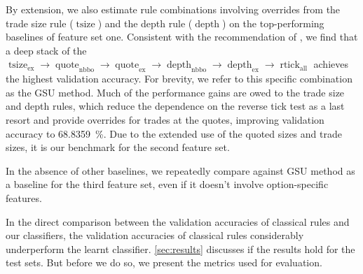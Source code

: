 By extension, we also estimate rule combinations involving overrides from the trade size rule ($\operatorname{tsize}$) and the depth rule ($\operatorname{depth}$) on the top-performing baselines of feature set one. Consistent with the recommendation of \textcite[][14]{grauerOptionTradeClassification2022}, we find that a deep stack of the $\operatorname{tsize}_{\mathrm{ex}} \to \operatorname{quote}_{\mathrm{nbbo}} \to \operatorname{quote}_{\mathrm{ex}} \to \operatorname{depth}_{\mathrm{nbbo}} \to \operatorname{depth}_{\mathrm{ex}} \to \operatorname{rtick}_{\mathrm{all}}$ achieves the highest validation accuracy. For brevity, we refer to this specific combination as the \gls{GSU} method. Much of the performance gains are owed to the trade size and depth rules, which reduce the dependence on the reverse tick test as a last resort and provide overrides for trades at the quotes, improving validation accuracy to \SI{68.8359}{\percent}. Due to the extended use of the quoted sizes and trade sizes, it is our benchmark for the second feature set.

In the absence of other baselines, we repeatedly compare against \gls{GSU} method as a baseline for the third feature set, even if it doesn't involve option-specific features.

In the direct comparison between the validation accuracies of classical rules and our classifiers, the validation accuracies of classical rules considerably underperform the learnt classifier. \cref{sec:results} discusses if the results hold for the test sets. But before we do so, we present the metrics used
for evaluation.